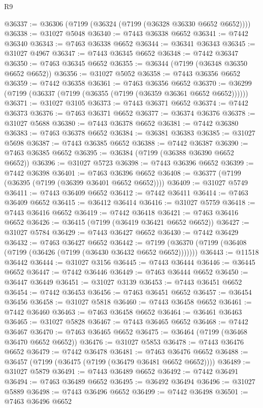 \begin{lexlean}{R9}
\begin{coremodule}
@36337 := @36306 (@7199 (@36324 (@7199 (@36328 @36330 @6652 @6652))))
@36338 := @31027 @5048
@36340 := @7443 @36338 @6652
@36341 := @7442 @36340
@36343 := @7463 @36338 @6652
@36344 := @36341 @36343
@36345 := @31027 @4967
@36347 := @7443 @36345 @6652
@36348 := @7442 @36347
@36350 := @7463 @36345 @6652
@36355 := @36344 (@7199 (@36348 @36350 @6652 @6652))
@36356 := @31027 @5052
@36358 := @7443 @36356 @6652
@36359 := @7442 @36358
@36361 := @7463 @36356 @6652
@36370 := @36299 (@7199 (@36337 (@7199 (@36355 (@7199 (@36359 @36361 @6652 @6652))))))
@36371 := @31027 @3105
@36373 := @7443 @36371 @6652
@36374 := @7442 @36373
@36376 := @7463 @36371 @6652
@36377 := @36374 @36376
@36378 := @31027 @5688
@36380 := @7443 @36378 @6652
@36381 := @7442 @36380
@36383 := @7463 @36378 @6652
@36384 := @36381 @36383
@36385 := @31027 @5698
@36387 := @7443 @36385 @6652
@36388 := @7442 @36387
@36390 := @7463 @36385 @6652
@36395 := @36384 (@7199 (@36388 @36390 @6652 @6652))
@36396 := @31027 @5723
@36398 := @7443 @36396 @6652
@36399 := @7442 @36398
@36401 := @7463 @36396 @6652
@36408 := @36377 (@7199 (@36395 (@7199 (@36399 @36401 @6652 @6652))))
@36409 := @31027 @5749
@36411 := @7443 @36409 @6652
@36412 := @7442 @36411
@36414 := @7463 @36409 @6652
@36415 := @36412 @36414
@36416 := @31027 @5759
@36418 := @7443 @36416 @6652
@36419 := @7442 @36418
@36421 := @7463 @36416 @6652
@36426 := @36415 (@7199 (@36419 @36421 @6652 @6652))
@36427 := @31027 @5784
@36429 := @7443 @36427 @6652
@36430 := @7442 @36429
@36432 := @7463 @36427 @6652
@36442 := @7199 (@36370 (@7199 (@36408 (@7199 (@36426 (@7199 (@36430 @36432 @6652 @6652)))))))
@36443 := @11518 @36442
@36444 := @31027 @3156
@36445 := @7443 @36444
@36446 := @36445 @6652
@36447 := @7442 @36446
@36449 := @7463 @36444 @6652
@36450 := @36447 @36449
@36451 := @31027 @3139
@36453 := @7443 @36451 @6652
@36454 := @7442 @36453
@36456 := @7463 @36451 @6652
@36457 := @36454 @36456
@36458 := @31027 @5818
@36460 := @7443 @36458 @6652
@36461 := @7442 @36460
@36463 := @7463 @36458 @6652
@36464 := @36461 @36463
@36465 := @31027 @5828
@36467 := @7443 @36465 @6652
@36468 := @7442 @36467
@36470 := @7463 @36465 @6652
@36475 := @36464 (@7199 (@36468 @36470 @6652 @6652))
@36476 := @31027 @5853
@36478 := @7443 @36476 @6652
@36479 := @7442 @36478
@36481 := @7463 @36476 @6652
@36488 := @36457 (@7199 (@36475 (@7199 (@36479 @36481 @6652 @6652))))
@36489 := @31027 @5879
@36491 := @7443 @36489 @6652
@36492 := @7442 @36491
@36494 := @7463 @36489 @6652
@36495 := @36492 @36494
@36496 := @31027 @5889
@36498 := @7443 @36496 @6652
@36499 := @7442 @36498
@36501 := @7463 @36496 @6652

\end{coremodule}
\end{lexlean}
